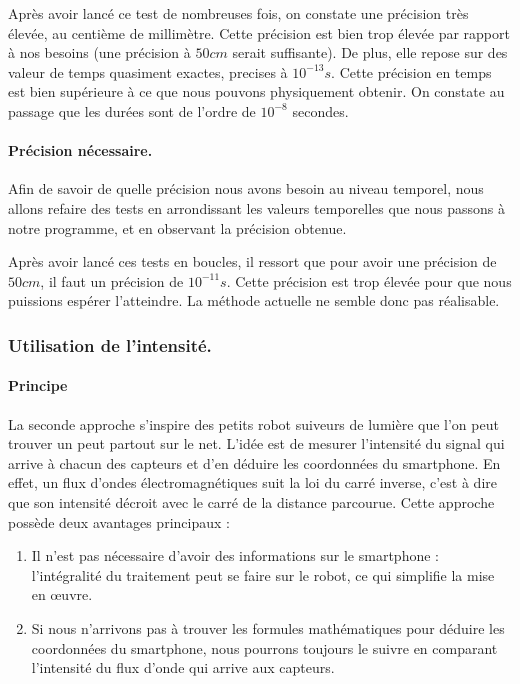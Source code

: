 \documentclass{article}
\begin{document}
Après avoir lancé ce test de nombreuses fois, on constate une précision très élevée, au centième de millimètre. Cette précision est bien trop élevée par rapport à nos besoins (une précision à $50cm$ serait suffisante). De plus, elle repose sur des valeur de temps quasiment exactes, precises à $10^{-13}s$. Cette précision en temps est bien supérieure à ce que nous pouvons physiquement obtenir. On constate au passage que les durées sont de l'ordre de $10^{-8}$ secondes.

\paragraph{Précision nécessaire.}
Afin de savoir de quelle précision nous avons besoin au niveau temporel, nous allons refaire des tests en arrondissant les valeurs temporelles que nous passons à notre programme, et en observant la précision obtenue.

Après avoir lancé ces tests en boucles, il ressort que pour avoir une précision de $50cm$, il faut un précision de $10^{-11}s$. Cette précision est trop élevée pour que nous puissions espérer l'atteindre. La méthode actuelle ne semble donc pas réalisable.

\subsubsection{Utilisation de l'intensité.}
\paragraph{Principe} La seconde approche s'inspire des petits robot suiveurs de lumière que l'on peut trouver un peut partout sur le net. L'idée est de mesurer l'intensité du signal qui arrive à chacun des capteurs et d'en déduire les coordonnées du smartphone. En effet, un flux d'ondes électromagnétiques suit la loi du carré inverse, c'est à dire que son intensité décroit avec le carré de la distance parcourue. Cette approche possède deux avantages principaux : \begin{enumerate}
    \item Il n'est pas nécessaire d'avoir des informations sur le smartphone : l'intégralité du traitement peut se faire sur le robot, ce qui simplifie la mise en œuvre.
    \item Si nous n'arrivons pas à trouver les formules mathématiques pour déduire les coordonnées du smartphone, nous pourrons toujours le suivre en comparant l'intensité du flux d'onde qui arrive aux capteurs.
\end{enumerate}
\end{document}
